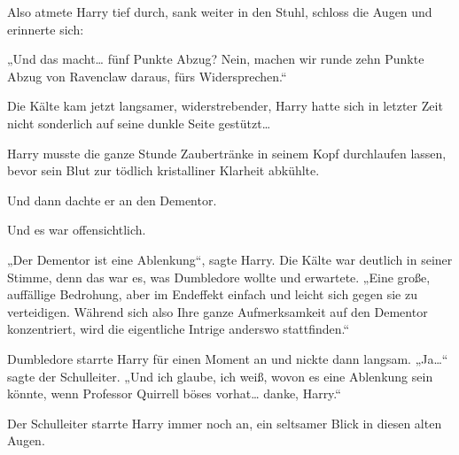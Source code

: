 Also atmete Harry tief durch, sank weiter in den Stuhl, schloss die Augen und erinnerte sich:

„Und das macht… fünf Punkte Abzug? Nein, machen wir runde zehn Punkte Abzug von Ravenclaw daraus, fürs Widersprechen.“

Die Kälte kam jetzt langsamer, widerstrebender, Harry hatte sich in letzter Zeit nicht sonderlich auf seine dunkle Seite gestützt…

Harry musste die ganze Stunde Zaubertränke in seinem Kopf durchlaufen lassen, bevor sein Blut zur tödlich kristalliner Klarheit abkühlte.

Und dann dachte er an den Dementor.

Und es war offensichtlich.

„Der Dementor ist eine Ablenkung“, sagte Harry. Die Kälte war deutlich in seiner Stimme, denn das war es, was Dumbledore wollte und erwartete. „Eine große, auffällige Bedrohung, aber im Endeffekt einfach und leicht sich gegen sie zu verteidigen. Während sich also Ihre ganze Aufmerksamkeit auf den Dementor konzentriert, wird die eigentliche Intrige anderswo stattfinden.“

Dumbledore starrte Harry für einen Moment an und nickte dann langsam. „Ja…“ sagte der Schulleiter. „Und ich glaube, ich weiß, wovon es eine Ablenkung sein könnte, wenn Professor Quirrell böses vorhat… danke, Harry.“

Der Schulleiter starrte Harry immer noch an, ein seltsamer Blick in diesen alten Augen.

